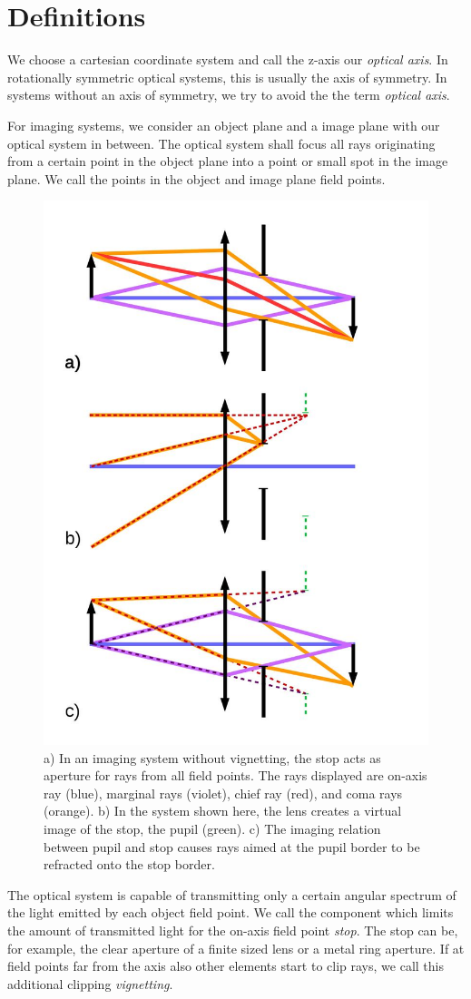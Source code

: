 \documentclass[12pt,a4paper,twoside,openright,BCOR10mm,headsepline,titlepage,abstracton,chapterprefix,final]{scrreprt}
\begin{document}
\section{Definitions}

We choose a cartesian coordinate system and call the z-axis our \emph{optical axis}. 
In rotationally symmetric optical systems, this is usually the axis of symmetry.
In systems without an axis of symmetry, we try to avoid the the term \emph{optical axis}.

For imaging systems, we consider an object plane and a image plane with our optical system in between. 
The optical system shall focus all rays originating from a certain point in the object plane into a point or small spot in the image plane.
We call the points in the object and image plane field points.

\begin{figure}
  \centering
   \includegraphics[width=0.5\columnwidth]{pupil}
  \caption{a) In an imaging system without vignetting, the stop acts as aperture for rays from all field points. The rays displayed are on-axis ray (blue), marginal rays (violet), chief ray (red), and coma rays (orange).
  b) In the system shown here, the lens creates a virtual image of the stop, the pupil (green).
  c) The imaging relation between pupil and stop causes rays aimed at the pupil border to be refracted onto the stop border.
  }
  \label{fig:pupil}
\end{figure}

The optical system is capable of transmitting only a certain angular spectrum of the light emitted by each object field point.
We call the component which limits the amount of transmitted light for the on-axis field point \emph{stop}.
The stop can be, for example, the clear aperture of a finite sized lens or a metal ring aperture.
If at field points far from the axis also other elements start to clip rays, we call this additional clipping \emph{vignetting}.
\end{document}
